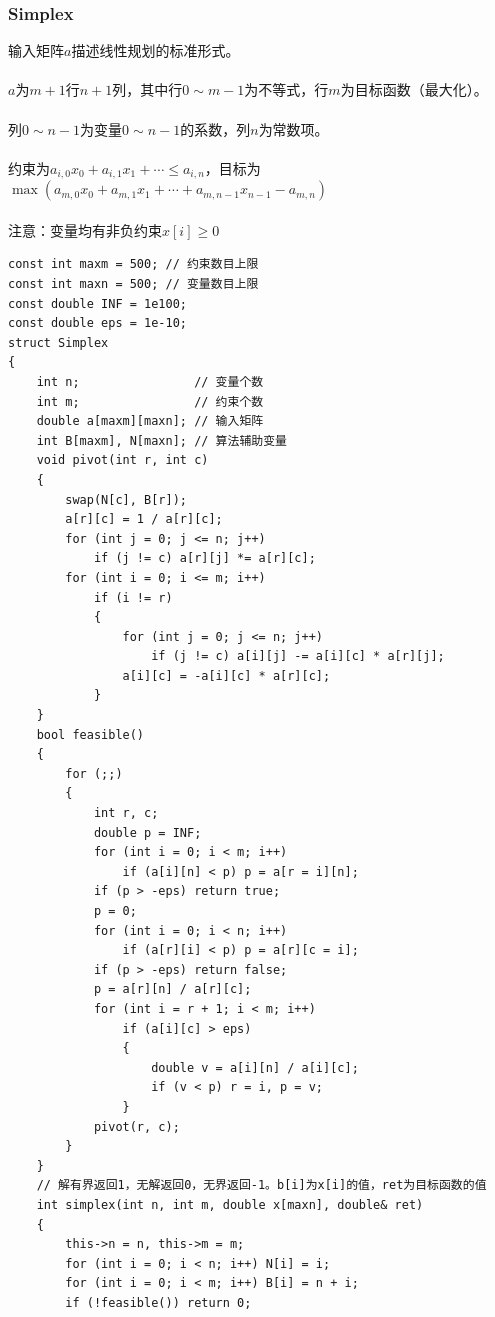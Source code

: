 \documentclass[twoside]{article}
\begin{document}
\subsubsection{Simplex}
输入矩阵$a$描述线性规划的标准形式。\\\\
$a$为$m+1$行$n+1$列，其中行$0 \sim m-1$为不等式，行$m$为目标函数（最大化）。\\\\
列$0 \sim n-1$为变量$0 \sim n-1$的系数，列$n$为常数项。\\\\
约束为$a_{i, 0}x_0 + a_{i, 1}x_1 + \cdots \le a_{i, n}$，目标为$\max(a_{m, 0}x_0 + a_{m, 1}x_1 + \cdots + a_{m, n - 1}x_{n - 1} - a_{m, n})$\\\\
注意：变量均有非负约束$x[i] \ge 0$
\begin{lstlisting}
const int maxm = 500; // 约束数目上限
const int maxn = 500; // 变量数目上限
const double INF = 1e100;
const double eps = 1e-10;
struct Simplex
{
    int n;                // 变量个数
    int m;                // 约束个数
    double a[maxm][maxn]; // 输入矩阵
    int B[maxm], N[maxn]; // 算法辅助变量
    void pivot(int r, int c)
    {
        swap(N[c], B[r]);
        a[r][c] = 1 / a[r][c];
        for (int j = 0; j <= n; j++)
            if (j != c) a[r][j] *= a[r][c];
        for (int i = 0; i <= m; i++)
            if (i != r)
            {
                for (int j = 0; j <= n; j++)
                    if (j != c) a[i][j] -= a[i][c] * a[r][j];
                a[i][c] = -a[i][c] * a[r][c];
            }
    }
    bool feasible()
    {
        for (;;)
        {
            int r, c;
            double p = INF;
            for (int i = 0; i < m; i++)
                if (a[i][n] < p) p = a[r = i][n];
            if (p > -eps) return true;
            p = 0;
            for (int i = 0; i < n; i++)
                if (a[r][i] < p) p = a[r][c = i];
            if (p > -eps) return false;
            p = a[r][n] / a[r][c];
            for (int i = r + 1; i < m; i++)
                if (a[i][c] > eps)
                {
                    double v = a[i][n] / a[i][c];
                    if (v < p) r = i, p = v;
                }
            pivot(r, c);
        }
    }
    // 解有界返回1，无解返回0，无界返回-1。b[i]为x[i]的值，ret为目标函数的值
    int simplex(int n, int m, double x[maxn], double& ret)
    {
        this->n = n, this->m = m;
        for (int i = 0; i < n; i++) N[i] = i;
        for (int i = 0; i < m; i++) B[i] = n + i;
        if (!feasible()) return 0;

\end{lstlisting}
\end{document}
